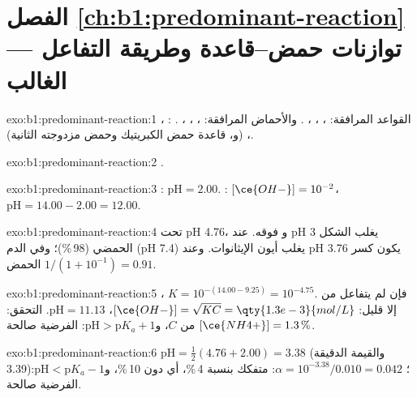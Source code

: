 \section*{الفصل \ref{ch:b1:predominant-reaction} --- توازنات حمض--قاعدة وطريقة التفاعل الغالب}

\begin{solution}{exo:b1:predominant-reaction:1}
القواعد المرافقة: ، ، ، . والأحماض
المرافقة: ، ، ، . : ،
،  (و، قاعدة حمض الكبريتيك وحمض
مزدوجته الثانية).
\end{solution}

\begin{solution}{exo:b1:predominant-reaction:2}
.
\end{solution}

\begin{solution}{exo:b1:predominant-reaction:3}
: $\mathrm{pH} = 2.00$. : $[\ce{OH-}] = 10^{-2}$،
$\mathrm{pH} = 14.00 - 2.00 = 12.00$.
\end{solution}

\begin{solution}{exo:b1:predominant-reaction:4}
 تحت pH 4.76، و فوقه. عند pH 3 يغلب الشكل
الحمضي (98\,\%)؛ وفي الدم (pH 7.4) يغلب أيون الإيثانوات. وعند pH 3.76 يكون
كسر الحمض $1/(1 + 10^{-1}) = 0.91$.
\end{solution}

\begin{solution}{exo:b1:predominant-reaction:5}
 ، $K = 10^{-(14.00 -
9.25)} = 10^{-4.75}$. فإن لم يتفاعل من  إلا قليل: $[\ce{OH-}] = \sqrt{K C} =
\qty{1.3e-3}{mol/L}$، $\mathrm{pH} = 11.13$. التحقق: $[\ce{NH4+}] = 1.3\,\%$
من $C$، و$\mathrm{pH} > \mathrm{p}K_a + 1$: الفرضية صالحة.
\end{solution}

\begin{solution}{exo:b1:predominant-reaction:6}
$\mathrm{pH} = \frac12(4.76 + 2.00) = 3.38$ (والقيمة الدقيقة 3.39)؛
$\alpha = 10^{-3.38}/0.010 = 0.042$: متفكك بنسبة 4\,\%، أي دون 10\,\%،
و$\mathrm{pH} < \mathrm{p}K_a - 1$: الفرضية صالحة.
\end{solution}

